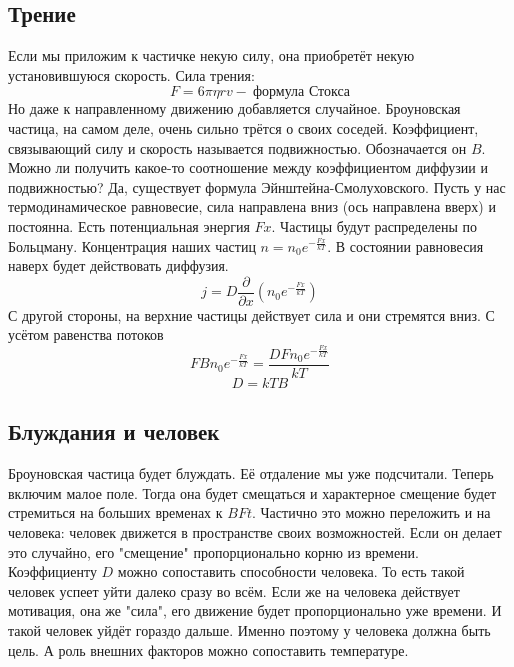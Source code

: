 \documentclass[a4paper, 12pt]{article}
\begin{document}
	\subsection{Трение}
	Если мы приложим к частичке некую силу, она приобретёт некую установившуюся скорость. Сила трения:
	\begin{equation*}
		F = 6 \pi \eta r v - \:	 \text{формула Стокса}
	\end{equation*}
	Но даже к направленному движению добавляется случайное. Броуновская частица, на самом деле, очень сильно трётся о своих соседей. Коэффициент, связывающий силу и скорость называется подвижностью. Обозначается он $B$. Можно ли получить какое-то соотношение между коэффициентом диффузии и подвижностью? Да, существует формула Эйнштейна-Смолуховского. Пусть у нас термодинамическое равновесие, сила направлена вниз (ось направлена вверх) и постоянна. Есть потенциальная энергия $Fx$. Частицы будут распределены по Больцману. Концентрация наших частиц $n = n_{0} e^{-\frac{Fx}{kT}}$. В состоянии равновесия наверх будет действовать диффузия.
	\begin{equation*}
		j = D \frac{\partial}{\partial x} (n_{0} e^{-\frac{Fx}{kT}})
	\end{equation*}
	С другой стороны, на верхние частицы действует сила и они стремятся вниз. С усётом равенства потоков
	\begin{equation*}
		FB n_{0} e^{-\frac{Fx}{kT}} = \frac{D F n_{0} e^{-\frac{Fx}{kT}}} {kT}
	\end{equation*}
	\begin{equation*}
		D = kTB
	\end{equation*}
	\subsection{Блуждания и человек}
	Броуновская частица будет блуждать. Её отдаление мы уже подсчитали. Теперь включим малое поле. Тогда она будет смещаться и характерное смещение будет стремиться на больших временах к $BFt$. Частично это можно переложить и на человека: человек движется в пространстве своих возможностей. Если он делает это случайно, его "смещение" пропорционально корню из времени. Коэффициенту $D$ можно сопоставить способности человека. То есть такой человек успеет уйти далеко сразу во всём. Если же на человека действует мотивация, она же "сила", его движение будет пропорционально уже времени. И такой человек уйдёт гораздо дальше. Именно поэтому у человека должна быть цель. А роль внешних факторов можно сопоставить температуре. 
\end{document}
